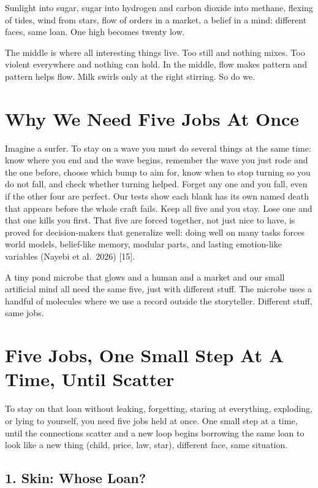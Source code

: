 \documentclass[11pt,a4paper]{article}
\begin{document}
Sunlight into sugar, sugar into hydrogen and carbon dioxide into methane, flexing of tides, wind from stars, flow of orders in a market, a belief in a mind: different faces, same loan. One high becomes twenty low.

The middle is where all interesting things live. Too still and nothing mixes. Too violent everywhere and nothing can hold. In the middle, flow makes pattern and pattern helps flow. Milk swirls only at the right stirring. So do we.

\section{Why We Need Five Jobs At Once}

Imagine a surfer. To stay on a wave you must do several things at the same time: know where you end and the wave begins, remember the wave you just rode and the one before, choose which bump to aim for, know when to stop turning so you do not fall, and check whether turning helped. Forget any one and you fall, even if the other four are perfect. Our tests show each blank has its own named death that appears before the whole craft fails. Keep all five and you stay. Lose one and that one kills you first. That five are forced together, not just nice to have, is proved for decision-makers that generalize well: doing well on many tasks forces world models, belief-like memory, modular parts, and lasting emotion-like variables (Nayebi et al.\ 2026) [15].

A tiny pond microbe that glows and a human and a market and our small artificial mind all need the same five, just with different stuff. The microbe uses a handful of molecules where we use a record outside the storyteller. Different stuff, same jobs.

\section{Five Jobs, One Small Step At A Time, Until Scatter}

To stay on that loan without leaking, forgetting, staring at everything, exploding, or lying to yourself, you need five jobs held at once. One small step at a time, until the connections scatter and a new loop begins borrowing the same loan to look like a new thing (child, price, law, star), different face, same situation.

\subsection{1. Skin: Whose Loan?}
\end{document}
